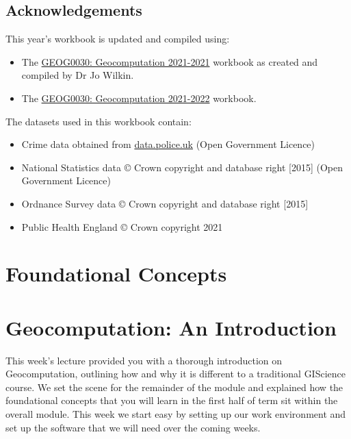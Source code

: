 \documentclass[
]{book}
\providecommand{\tightlist}{%
  \setlength{\itemsep}{0pt}\setlength{\parskip}{0pt}}
\begin{document}
\hypertarget{acknowledgements}{%
\section*{Acknowledgements}\label{acknowledgements}}

This year's workbook is updated and compiled using:

\begin{itemize}
\tightlist
\item
  The \href{https://jo-wilkin.github.io/GEOG0030/coursebook/index.html}{GEOG0030: Geocomputation 2021-2021} workbook as created and compiled by Dr Jo Wilkin.
\item
  The \href{https://jtvandijk.github.io/GEOG0030_20212022/}{GEOG0030: Geocomputation 2021-2022} workbook.
\end{itemize}

The datasets used in this workbook contain:

\begin{itemize}
\tightlist
\item
  Crime data obtained from \href{https://data.police.uk/}{data.police.uk} (Open Government Licence)
\item
  National Statistics data © Crown copyright and database right {[}2015{]} (Open Government Licence)
\item
  Ordnance Survey data © Crown copyright and database right {[}2015{]}
\item
  Public Health England © Crown copyright 2021
\end{itemize}

\hypertarget{foundational-concepts}{%
\chapter*{Foundational Concepts}\label{foundational-concepts}}

\hypertarget{geocomputation-an-introduction}{%
\chapter{Geocomputation: An Introduction}\label{geocomputation-an-introduction}}

This week's lecture provided you with a thorough introduction on Geocomputation, outlining how and why it is different to a traditional GIScience course. We set the scene for the remainder of the module and explained how the foundational concepts that you will learn in the first half of term sit within the overall module. This week we start easy by setting up our work environment and set up the software that we will need over the coming weeks.
\end{document}
